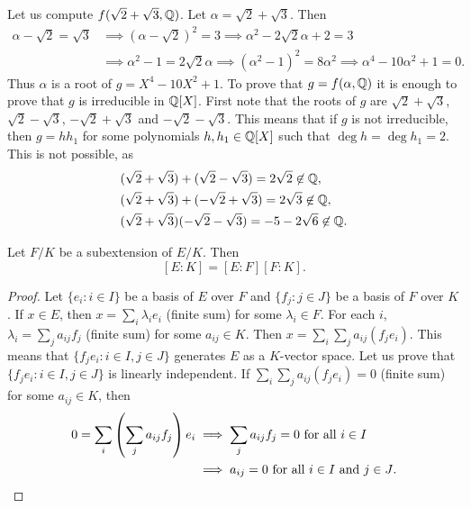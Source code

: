 
\begin{example}
	Let us compute 
	$f(\sqrt{2}+\sqrt{3},\mathbb{Q})$. Let $\alpha=\sqrt{2}+\sqrt{3}$. 
	Then 
	\begin{align*}
		\alpha-\sqrt{2}=\sqrt{3} & \implies 
		(\alpha-\sqrt{2})^2=3 \implies \alpha^2-2\sqrt{2}\alpha+2=3\\
		&\implies \alpha^2-1=2\sqrt{2}\alpha \implies
		(\alpha^2-1)^2=8\alpha^2\implies
		\alpha^4-10\alpha^2+1=0.
	\end{align*}
	Thus $\alpha$ is a root of $g=X^4-10X^2+1$. To prove that $g=f(\alpha,\mathbb{Q})$ 
	it is enough to prove that 
	$g$ is irreducible in $\mathbb{Q}[X]$. First note that 
	the roots
	of $g$ are $\sqrt{2}+\sqrt{3}$, $\sqrt{2}-\sqrt{3}$, 
	$-\sqrt{2}+\sqrt{3}$ and $-\sqrt{2}-\sqrt{3}$. This means that
	if $g$ is not irreducible, 
	then $g=hh_1$ for some polynomials $h,h_1\in\mathbb{Q}[X]$ such that
	$\deg h=\deg h_1=2$. This is not possible, as 
	\begin{align*}
   & (\sqrt{2}+\sqrt{3})+(\sqrt{2}-\sqrt{3})=2\sqrt{2}\not\in\mathbb{Q},\\
   & (\sqrt{2}+\sqrt{3})+(-\sqrt{2}+\sqrt{3})=2\sqrt{3}\not\in\mathbb{Q},\\ 
   & (\sqrt{2}+\sqrt{3})(-\sqrt{2}-\sqrt{3})=-5-2\sqrt{6}\not\in\mathbb{Q}.
    \end{align*}
\end{example}



\begin{proposition}
\label{pro:multiplicativity of degree}
	Let $F/K$ be a subextension of $E/K$. Then
	\[
	[E:K]=[E:F][F:K].
	\]
\end{proposition}

\begin{proof}
	Let $\{e_i:i\in I\}$ be a basis of $E$ over $F$
	and $\{f_j:j\in J\}$ be a basis of $F$ over $K$. If $x\in E$,
	then $x=\sum_i \lambda_ie_i$ (finite sum) 
	for some $\lambda_i\in F$. For each $i$, 
	$\lambda_i=\sum_j a_{ij}f_j$ (finite sum)
	for some $a_{ij}\in K$. Then 
	$x=\sum_i\sum_j a_{ij}(f_je_i)$. This means
	that $\{f_je_i:i\in I,j\in J\}$ generates
	$E$ as a $K$-vector space. Let us prove that 
	$\{f_je_i:i\in I,j\in J\}$
	is linearly independent. If $\sum_i\sum_j a_{ij}(f_je_i)=0$ (finite sum)
	for some $a_{ij}\in K$, 
	then
	\begin{align*}
		0=\sum_i\left(\sum_j a_{ij}f_j\right)e_i&\implies
		\sum_j a_{ij}f_j=0\text{ for all $i\in I$}\\
		&\implies 
		a_{ij}=0\text{ for all $i\in I$ and $j\in J$}.\qedhere
	\end{align*}
\end{proof}

